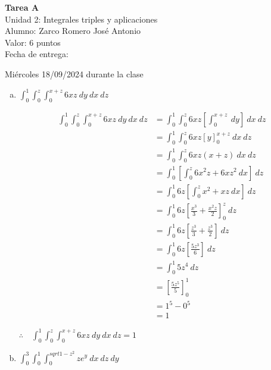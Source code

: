 \documentclass[12pt]{exam}
\begin{document}
\centering

\Large 
\textbf{Tarea A}\\
\large 
Unidad 2: Integrales triples y aplicaciones \\
Alumno: Zarco Romero José Antonio\\
Valor: 6 puntos\\
\normalsize
Fecha de entrega: 

Miércoles 18/09/2024 durante la clase

\vskip10pt

\normalsize

\pointformat{\bfseries\boldmath(\thepoints)}
\vskip10pt

\begin{questions}


  \begin{enumerate}[(a)]
  \item $\int_0^1 \int_0^z \int_0^{x+z} 6xz ~ dy ~ dx ~ dz$

    \begin{align*}
      \int_0^1 \int_0^z \int_0^{x+z} 6xz ~ dy ~ dx ~ dz
      &= \int_0^1 \int_0^z 6xz \left[\int_0^{x+z} ~ dy\right] ~ dx ~ dz \\
      &= \int_0^1 \int_0^z 6xz \left[y\right]_0^{x+z} ~ dx ~ dz \\
      &= \int_0^1 \int_0^z 6xz(x+z) ~ dx ~ dz \\
      &= \int_0^1 \left[ \int_0^z 6x^2z + 6xz^2 ~ dx \right] ~ dz \\
      &= \int_0^1 6z \left[ \int_0^z x^2 + xz ~ dx \right] ~ dz \\
      &= \int_0^1 6z \left[ \frac{x^3}{3} + \frac{x^2z}{2} \right]_0^z ~ dz \\
      &= \int_0^1 6z \left[ \frac{z^3}{3} + \frac{z^3}{2} \right] ~ dz \\
      &= \int_0^1 6z \left[ \frac{5z^3}{6} \right] ~ dz \\
      &= \int_0^1 5z^4 ~ dz \\
      &= \left[ \frac{5z^5}{5} \right]_0^1 \\
      &= 1^5 - 0^5 \\
      &= 1
    \end{align*}

    $\therefore \quad \int_0^1 \int_0^z \int_0^{x+z} 6xz ~ dy ~ dx ~ dz = 1$

  \item $\int_0^3 \int_0^1 \int_0^{sqrt{1-z^2}} ze^y ~ dx ~ dz ~ dy$


\end{enumerate}
\end{questions}
\end{document}
